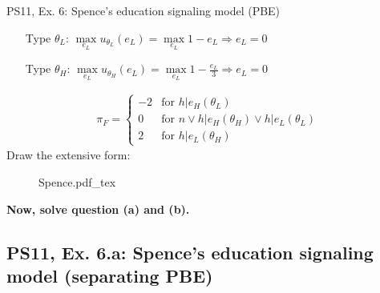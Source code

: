 \begin{frame}{PS11, Ex. 6: Spence’s education signaling model (PBE)}
\begin{multicols}{2}
\begin{itemize}
        \item[Type $\theta_L$:] $\max\limits_{e_L}u_{\theta_L}(e_L)=\max\limits_{e_L}1-e_L\Rightarrow e_L=0$\\
        \item[Type $\theta_H$:] $\max\limits_{e_L}u_{\theta_H}(e_L)=\max\limits_{e_L}1-\frac{e_L}{3}\Rightarrow e_L=0$
      \end{itemize}\vspace{-12pt}
      \begin{align*}
        \pi_{F}=\left\{\begin{array}{rl}
           -2 & \text{for }h|e_H(\theta_L) \\
            0 & \text{for }n\vee h|e_H(\theta_H)\vee h|e_L(\theta_L) \\
            2 & \text{for }h|e_L(\theta_H)
        \end{array}\right.
      \end{align*}
      \vfill\null\columnbreak
      Draw the extensive form:\vspace{-14pt}
      \begin{figure}[!h]
        \center{}
        {Spence.pdf_tex}
      \end{figure}\vspace{-4pt}
      \textbf{Now, solve question (a) and (b).}
      \vfill\null
    \end{multicols}
\end{frame}


\subsection{PS11, Ex. 6.a: Spence’s education signaling model (separating PBE)}

